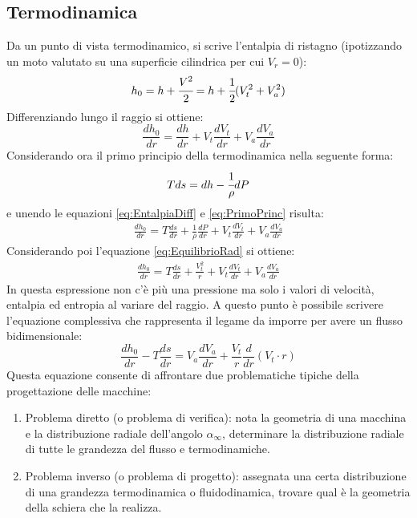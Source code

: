 \subsection{Termodinamica}
Da un punto di vista termodinamico, si scrive l'entalpia di ristagno (ipotizzando un moto valutato su una superficie cilindrica per cui $V_r = 0$):
\begin{align*}
h_0 = h + \cfrac{V^2}{2} = h + \cfrac{1}{2}(V_t^2 + V_a^2)
\end{align*}
Differenziando lungo il raggio si ottiene:
\begin{equation}
\frac{dh_0}{dr} = \frac{dh}{dr} + V_t \frac{dV_t}{dr} + V_a \frac{dV_a}{dr}
\label{eq:EntalpiaDiff}
\end{equation}
Considerando ora il primo principio della termodinamica nella seguente forma:
\begin{equation}
Tds = dh - \cfrac{1}{\rho} dP
\label{eq:PrimoPrinc}
\end{equation}
e unendo le equazioni \ref{eq:EntalpiaDiff} e \ref{eq:PrimoPrinc} risulta:
\begin{align*}
\frac{dh_0}{dr} = T \frac{ds}{dr} + \frac{1}{\rho} \frac{dP}{dr} + V_t \frac{dV_t}{dr} + V_a \frac{dV_a}{dr}
\end{align*}
Considerando poi l'equazione \ref{eq:EquilibrioRad} si ottiene:
\begin{align*}
\frac{dh_0}{dr} = T \frac{ds}{dr} + \frac{V_t^2}{r} + V_t \frac{dV_t}{dr} + V_a \frac{dV_a}{dr}
\end{align*}
In questa espressione non c'è più una pressione ma solo i valori di velocità, entalpia ed entropia al variare del raggio. A questo punto è possibile scrivere l'equazione complessiva che rappresenta il legame da imporre per avere un flusso bidimensionale:
\begin{equation}
\boxed{ \frac{dh_0}{dr} - T\frac{ds}{dr} = V_a \frac{dV_a}{dr} + \frac{V_t}{r} \frac{d}{dr}(V_t \cdot r)}
\end{equation}
Questa equazione consente di affrontare due problematiche tipiche della progettazione delle macchine:
\begin{enumerate}
\item Problema diretto (o problema di verifica): nota la geometria di una macchina e la distribuzione radiale dell'angolo $\alpha_{\infty}$, determinare la distribuzione radiale di tutte le grandezza del flusso e termodinamiche.
\item Problema inverso (o problema di progetto): assegnata una certa distribuzione di una grandezza termodinamica o fluidodinamica, trovare qual è la geometria della schiera che la realizza.
\end{enumerate}
